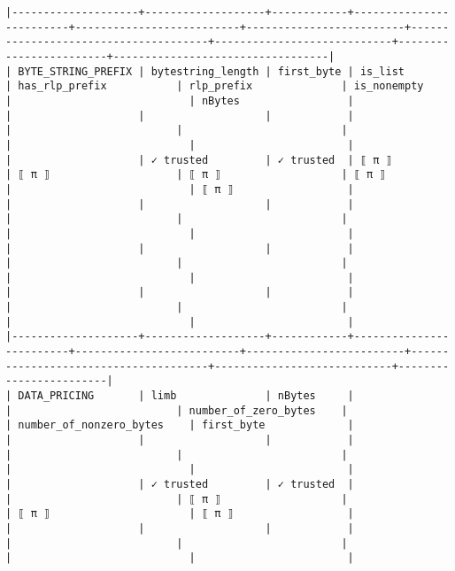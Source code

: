 \documentclass[varwidth=\maxdimen,margin=0.5cm,multi={verbatim}]{standalone}
\begin{document}
\begin{verbatim}
|--------------------+-------------------+------------+-------------------------+--------------------------+-------------------------+--------------------------------------+----------------------------+------------------------+----------------------------------|
| BYTE_STRING_PREFIX | bytestring_length | first_byte | is_list                 | has_rlp_prefix           | rlp_prefix              | is_nonempty                          |                            | nBytes                 |
|                    |                   |            |                         |                          |                         |                                      |                            |                        |
|                    | ✓ trusted         | ✓ trusted  | ⟦ π ⟧                   | ⟦ π ⟧                    | ⟦ π ⟧                   | ⟦ π ⟧                                |                            | ⟦ π ⟧                  |
|                    |                   |            |                         |                          |                         |                                      |                            |                        |
|                    |                   |            |                         |                          |                         |                                      |                            |                        |
|                    |                   |            |                         |                          |                         |                                      |                            |                        |
|--------------------+-------------------+------------+-------------------------+--------------------------+-------------------------+--------------------------------------+----------------------------+------------------------|
| DATA_PRICING       | limb              | nBytes     |                         |                          | number_of_zero_bytes    |                                      | number_of_nonzero_bytes    | first_byte             |
|                    |                   |            |                         |                          |                         |                                      |                            |                        |
|                    | ✓ trusted         | ✓ trusted  |                         |                          | ⟦ π ⟧                   |                                      | ⟦ π ⟧                      | ⟦ π ⟧                  |
|                    |                   |            |                         |                          |                         |                                      |                            |                        |

\end{verbatim}
\end{document}
